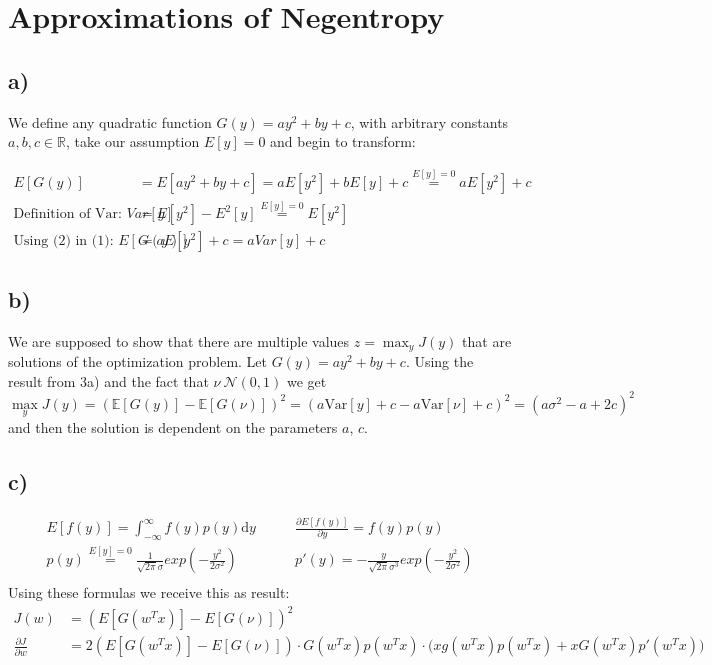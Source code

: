 \documentclass[paper=a4,fontsize=10pt,DIV11,BCOR10mm]{scrartcl}
\begin{document}
\section{Approximations of Negentropy}

\subsection*{a)}

We define any quadratic function $G(y) = ay^2 + by + c$, with arbitrary constants $a,b,c \in \mathbb{R}$, take our assumption $E[y] = 0$ and begin to transform:

\begin{align}
E[G(y)] &= E[ay^2 + by + c] = aE[y^2] + b E[y] + c \stackrel{E[y] = 0}{=} aE[y^2] + c  \\
\text{Definition of Var: }Var[y] &= E[y^2] - E^2[y] \stackrel{E[y] = 0}{=} E[y^2] \\
\text{Using (2) in (1): } E[G(y)] &= aE[y^2] + c = aVar[y] + c
\end{align}

\subsection*{b)}
We are supposed to show that there are multiple values $z = \max_y J(y)$ that are solutions of the optimization problem. Let $G(y) = a y^2 + b y + c$. Using the result from 3a) and the fact that $\nu ~ \mathcal{N}(0, 1)$ we get
\[ \max_y J(y) = (\mathbb{E}[G(y)] - \mathbb{E}[G(\nu)])^2 = (a \text{Var}[y] + c - a \text{Var}[\nu] + c)^2 = (a \sigma^2 - a + 2 c)^2 \]
and then the solution is dependent on the parameters $a$, $c$.

\subsection*{c)}
\begin{align*}
E[f(y)] = \int_{-\infty}^{\infty}f(y)p(y)\mathrm{d}y & \quad\quad
\frac{\partial E[f(y)]}{\partial y} = f(y)p(y)\\
p(y) \stackrel{E[y] = 0}{=} \frac{1}{\sqrt{2\pi}\sigma} exp{(-\frac{y^2}{2\sigma^2})} & \quad\quad p'(y) = - \frac{y}{\sqrt{2\pi}\sigma^3} exp{(-\frac{y^2}{2\sigma^2})}\\
\end{align*}
Using these formulas we receive this as result:
\begin{align*}
J(w) &= (E[G(w^Tx)] - E[G(\nu)])^2 \\
\frac{\partial J}{\partial w} &= 2(E[G(w^Tx)] - E[G(\nu)]) \cdot G(w^Tx)p(w^Tx) \cdot \big( xg(w^Tx) p(w^Tx) + xG(w^Tx)p'(w^Tx)\big)
\end{align*}
\end{document}
